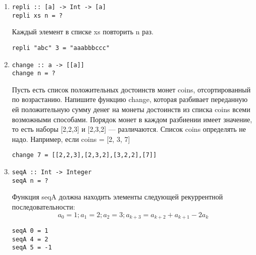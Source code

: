 \documentclass[a4paper,10pt]{article}
\begin{document}
\begin{enumerate}
\item {
\begin{lstlisting}
repli :: [a] -> Int -> [a]
repli xs n = ?
\end{lstlisting}
Каждый элемент в списке xs повторить n раз.
\begin{lstlisting}
repli "abc" 3 = "aaabbbccc"
\end{lstlisting}
}

\item {
\begin{lstlisting}
change :: a -> [[a]]
change n = ?
\end{lstlisting}
Пусть есть список положительных достоинств монет coins, отсортированный по возрастанию.
Напишите функцию change, которая разбивает переданную ей положительную сумму денег на монеты
достоинств из списка coins всеми возможными способами.
Порядок монет в каждом разбиении имеет значение, то есть наборы [2,2,3] и [2,3,2] — различаются.
Список coins определять не надо.
Например, если coins = [2, 3, 7]
\begin{lstlisting}
change 7 = [[2,2,3],[2,3,2],[3,2,2],[7]]
\end{lstlisting}
}

\item {
\begin{lstlisting}
seqA :: Int -> Integer
seqA n = ?
\end{lstlisting}
Функция seqA должна находить элементы следующей рекуррентной последовательности:
$$a_0 = 1; a_1 = 2; a_2 = 3; a_{k+3} = a_{k+2} + a_{k+1} - 2a_k$$
\begin{lstlisting}
seqA 0 = 1
seqA 4 = 2
seqA 5 = -1
\end{lstlisting}
}

\end{enumerate}
\end{document}
